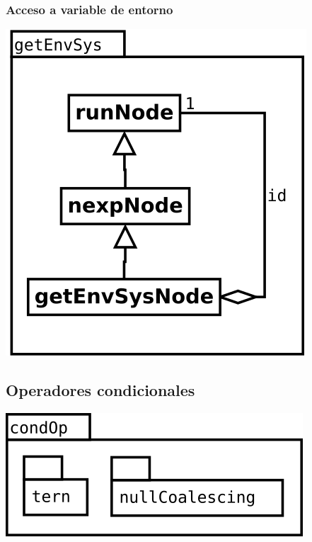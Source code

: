 \subsubsection {Acceso a variable de entorno} 
\begin{center}
\includegraphics[scale=0.4]{getEnvSys.png} \\
\end{center}

\pagebreak
\subsection {Operadores condicionales} 
\begin{center}
\includegraphics[scale=0.4]{condOp-package.png} \\
\end{center}

